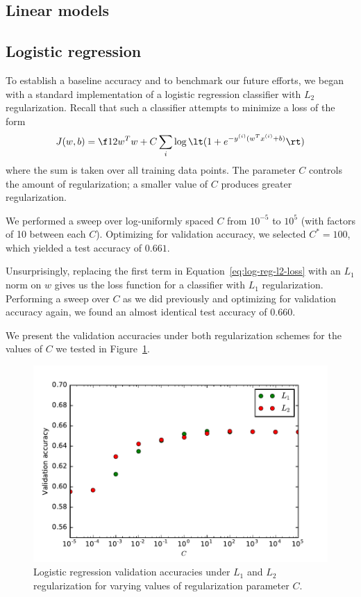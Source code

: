 \documentclass{article}
\newcommand{\sind}[1]{^{(#1)}}
\begin{document}
\begin{multicols}{2}

\section{Linear models}

\subsection{Logistic regression}
\label{subsec:logreg}

To establish a baseline accuracy
and to benchmark our future efforts,
we began with a standard implementation
of a logistic regression classifier
with $L_2$ regularization.
Recall that such a classifier attempts to minimize a loss of the form
\begin{equation}
    \label{eq:log-reg-l2-loss}
    J(w, b) = \f12 w^T w + C \sum_i \log\lt(1 + e^{-y\sind{i}(w^T x\sind{i} + b)}\rt)
\end{equation}
where the sum is taken over all training data points.
The parameter $C$ controls the amount of regularization;
a smaller value of $C$ produces greater regularization.

We performed a sweep over log-uniformly spaced $C$
from $10^{-5}$ to $10^5$ (with factors of 10 between each $C$).
Optimizing for validation accuracy,
we selected $C^* = 100$,
which yielded a test accuracy of $0.661$.

Unsurprisingly,
replacing the first term in Equation~\ref{eq:log-reg-l2-loss}
with an $L_1$ norm on $w$
gives us the loss function for a classifier with $L_1$ regularization.
Performing a sweep over $C$ as we did previously
and optimizing for validation accuracy again,
we found an almost identical test accuracy of $0.660$.

We present the validation accuracies
under both regularization schemes
for the values of $C$ we tested
in Figure~\ref{fig:log-reg-c-sweep}.

\begin{figure}[t] %
   \centering
   \includegraphics[width=4.5in]{img/log-reg-C-sweep.pdf}
   \caption{Logistic regression validation accuracies
   under $L_1$ and $L_2$ regularization
   for varying values of regularization parameter $C$.}
   \label{fig:log-reg-c-sweep}
\end{figure}



\end{multicols}
\end{document}
